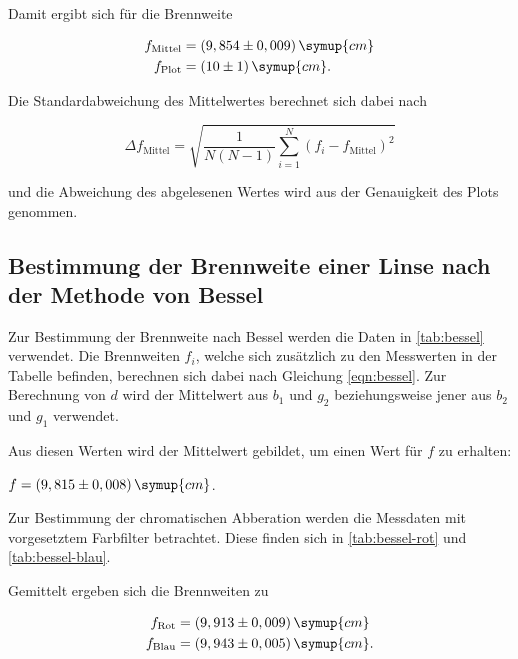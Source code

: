 Damit ergibt sich für die Brennweite

\begin{align*}
    f_\text{Mittel} &= (9,854 \pm 0,009) \, \symup{cm}\\
    f_\text{Plot} &= (10 \pm 1) \, \symup{cm}.
\end{align*}

Die Standardabweichung des Mittelwertes berechnet sich dabei nach

\begin{equation}
  \label{eqn:mittel}
  \Delta f_\text{Mittel} = \sqrt{ \frac{1}{N(N-1)} \sum^N_{i=1} (f_i - f_\text{Mittel})^2 }
\end{equation}

und die Abweichung des abgelesenen Wertes wird aus der Genauigkeit des Plots genommen.



\subsection{Bestimmung der Brennweite einer Linse nach der Methode von Bessel}

Zur Bestimmung der Brennweite nach Bessel werden die Daten in \autoref{tab:bessel} verwendet.
Die Brennweiten $f_i$, welche sich zusätzlich zu den Messwerten in der Tabelle befinden, berechnen sich dabei nach Gleichung \eqref{eqn:bessel}.
Zur Berechnung von $d$ wird der Mittelwert aus $b_1$ und $g_2$ beziehungsweise jener aus $b_2$ und $g_1$ verwendet.



Aus diesen Werten wird der Mittelwert gebildet, um einen Wert für $f$ zu erhalten:

\begin{center}
  $f = (9,815 \pm 0,008) \, \symup{cm}$.
\end{center}

Zur Bestimmung der chromatischen Abberation werden die Messdaten mit vorgesetztem Farbfilter betrachtet.
Diese finden sich in \autoref{tab:bessel-rot} und \autoref{tab:bessel-blau}.





Gemittelt ergeben sich die Brennweiten zu

\begin{align*}
  f_\text{Rot} &=  (9,913 \pm 0,009) \, \symup{cm}\\
  f_\text{Blau} &= (9,943 \pm 0,005) \, \symup{cm}.
\end{align*}



